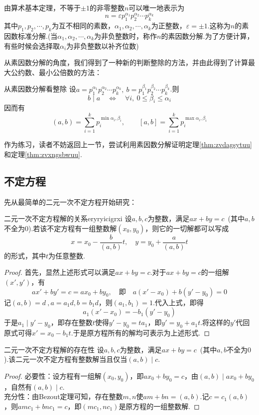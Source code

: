 由算术基本定理，不等于$\pm 1$的非零整数$n$可以唯一地表示为$$n = \varepsilon p_1^{\alpha _1} p_2^{\alpha _2} \cdots p_k^{\alpha _k}$$
其中$p_1,p_2, \cdots ,p_k$为互不相同的素数，$\alpha _1 ,\alpha _2,\cdots ,\alpha _k$为正整数，$\varepsilon =\pm 1$.这称为$n$的素因数标准分解.(当$\alpha _1 ,\alpha _2,\cdots ,\alpha _k$为非负整数时，称作$n$的素因数分解.为了方便计算，有些时候会选择取$\alpha _i$为非负整数以补齐位数)

从素因数分解的角度，我们得到了一种新的判断整除的方法，并由此得到了计算最大公约数、最小公倍数的方法：

\begin{proposition}{从素因数分解看整除}
	设$a=p_1^{\alpha _1} p_2^{\alpha _2} \cdots p_k^{\alpha _k},~b=p_1^{\beta _1} p_2^{\beta _2} \cdots p_k^{\beta _k}$.则
	$$b \mid a \quad \Longleftrightarrow \quad \forall i,~0 \leq \beta _i \leq \alpha _i$$
	因而有
	$$(a,b)=\sum_{i=1}^{k} p_i^{\min {\alpha _i,\beta _i}}, \quad \quad [a,b]=\sum_{i=1}^{k} p_i^{\max {\alpha _i,\beta _i}}$$
\end{proposition}

作为练习，读者不妨返回上一节，尝试利用素因数分解证明定理\ref{thm:zvdagsytuu}和定理\ref{thm:zvxngsbwuu}.

\subsection{不定方程}

先从最简单的二元一次不定方程开始研究：

\begin{theorem}{二元一次不定方程解的关系}{eryryicigrxi}
	设$a,b,c$为整数，满足$ax+by=c$~(其中$a,b$不全为$0$).若该不定方程有一组整数解$(x_0,y_0)$，则它的一切解都可以写成$$x=x_0-\frac{b}{(a,b)}t,\quad y=y_0+\frac{a}{(a,b)}t$$
	的形式，其中$t$为任意整数.
\end{theorem}
\begin{proof}
	首先，显然上述形式可以满足$ax+by=c$.对于$ax+by=c$的一组解$(x',y')$，有$$ax'+by' = c = ax_0+by_0,\quad \textit{即} \quad a(x'-x_0) + b(y'-y_0) = 0$$
	记$(a,b)=d~,a=a_1d,b=b_1d$，则$(a_1,b_1)=1$.代入上式，即得$$a_1(x'-x_0)=-b_1(y'-y_0)$$
	于是$a_1 \mid y'-y_0$，即存在整数$t$使得$y'-y_0=ta_1$，即$y'=y_0+a_1t$.将这样的$y'$代回原式可得$x'=x_0-b_1t$.于是原方程所有的解均可表示为上述形式.
\end{proof}

\begin{theorem}{二元一次不定方程解的存在性}
	设$a,b,c$为整数，满足$ax+by=c$~(其中$a,b$不全为$0$).该二元一次不定方程有整数解当且仅当$(a,b) \mid c$.
\end{theorem}
\begin{proof}
	必要性：设方程有一组解$(x_0,y_0)$，即$ax_0+by_0=c$，由$(a,b) \mid ax_0+by_0$，自然有$(a,b) \mid c$. \\
	充分性：由Bezout定理可知，存在整数$m,n$使$am+bn=(a,b)$.记$c=c_1(a,b)$，则$amc_1+bnc_1=c$，即$(mc_1,nc_1)$是原方程的一组整数解.
\end{proof}

